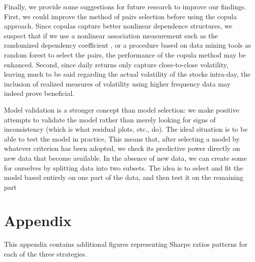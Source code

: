 \documentclass[a4paper]{article}
\begin{document}
	Finally, we provide some suggestions for future research to improve our findings. First, we could improve the method of pairs selection before using the copula approach. Since copulas capture better nonlinear dependence structures, we suspect that if we use a nonlinear association measurement such as the randomized dependency coefficient \citep{lopez2013randomized}, or a procedure based on data mining tools as random forest \citep{dlrz10} to select the pairs, the performance of the copula method may be enhanced. Second, since daily returns only capture close-to-close volatility, leaving much to be said regarding the actual volatility of the stocks intra-day, the inclusion of realized measures of volatility using higher frequency data may indeed prove beneficial.
	
	Model validation is a stronger concept than model selection: we make positive attempts to validate the model rather than merely looking for signs of inconsistency (which is what residual plots, etc., do). The ideal situation is to be able to test the model in practice, This means that, after selecting a model by whatever criterion has been adopted, we check its predictive power directly on new data that become available. In the absence of new data, we can create some for ourselves by splitting data into two subsets. The idea is to select and fit the model based entirely on one part of the data, and then test it on the remaining part
	
	
	
	
	\newpage
	
	\section*{Appendix}
	\vspace{0.6cm}
	
	
	This appendix contains additional figures representing Sharpe ratios patterns for each of the three strategies.
	
%	
	
\end{document}
